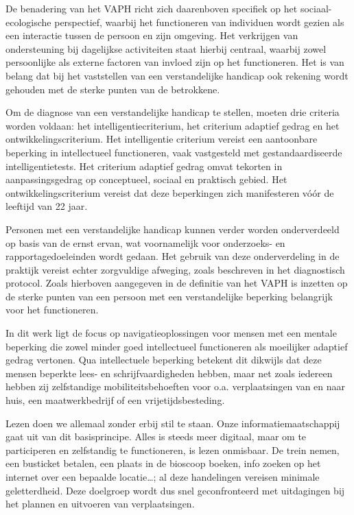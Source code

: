 De benadering van het VAPH richt zich daarenboven specifiek op het sociaal- ecologische perspectief, waarbij het functioneren van individuen wordt gezien als een interactie tussen de persoon en zijn omgeving. Het verkrijgen van ondersteuning bij dagelijkse activiteiten staat hierbij centraal, waarbij zowel persoonlijke als externe factoren van invloed zijn op het functioneren. Het is van belang dat bij het vaststellen van een verstandelijke handicap ook rekening wordt gehouden met de sterke punten van de betrokkene. 

Om de diagnose van een verstandelijke handicap te stellen, moeten drie criteria worden voldaan: het intelligentiecriterium, het criterium adaptief gedrag en het ontwikkelingscriterium. Het intelligentie criterium vereist een aantoonbare beperking in intellectueel functioneren, vaak vastgesteld met gestandaardiseerde intelligentietests. Het criterium adaptief gedrag omvat tekorten in aanpassingsgedrag op conceptueel, sociaal en praktisch gebied. Het ontwikkelingscriterium vereist dat deze beperkingen zich manifesteren vóór de leeftijd van 22 jaar. 

Personen met een verstandelijke handicap kunnen verder worden onderverdeeld op basis van de ernst ervan, wat voornamelijk voor on\-der\-zoeks- en rapportagedoeleinden wordt gedaan. Het gebruik van deze onderverdeling in de praktijk vereist echter zorgvuldige afweging, zoals beschreven in het diagnostisch protocol. Zoals hierboven aangegeven in de definitie van het VAPH is inzetten op de sterke punten van een persoon met een verstandelijke beperking belangrijk voor het functioneren.

In dit werk ligt de focus op navigatieoplossingen voor mensen met een mentale beperking die zowel minder goed intellectueel functioneren als moeilijker adaptief gedrag vertonen. Qua intellectuele beperking betekent dit dikwijls dat deze mensen beperkte lees- en schrijfvaardigheden hebben, maar net zoals iedereen hebben zij zelfstandige mobiliteitsbehoeften voor o.a. verplaatsingen van en naar huis, een maatwerkbedrijf of een vrijetijdsbesteding.

Lezen doen we allemaal zonder erbij stil te staan. Onze informatiemaatschappij gaat uit van dit basisprincipe. Alles is steeds meer digitaal, maar om te participeren en zelfstandig te functioneren, is lezen onmisbaar. De trein nemen, een busticket betalen, een plaats in de bioscoop boeken, info zoeken op het internet over een bepaalde locatie\ldots; al deze handelingen vereisen minimale geletterdheid. Deze doelgroep wordt dus snel geconfronteerd met uitdagingen bij het plannen en uitvoeren van verplaatsingen. 

